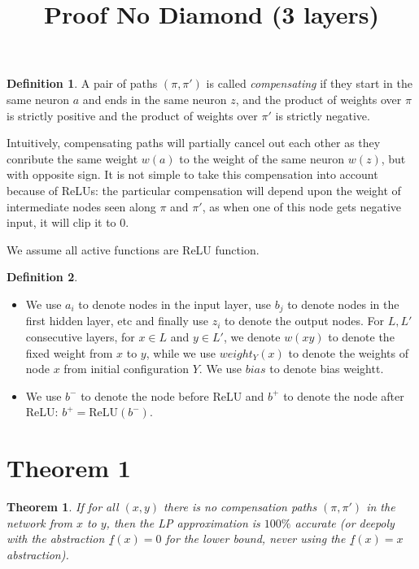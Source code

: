 \documentclass[]{article}
\title{Proof No Diamond (3 layers)}
\date{}
\newtheorem{theorem}{Theorem}
\theoremstyle{definition}
\newtheorem{definition}{Definition}
\newcommand{\ReLU}{\mathrm{ReLU}}
\begin{document}
\begin{definition}
	A pair of paths $(\pi,\pi')$
	is called {\em compensating} if they start in the same neuron $a$ and 
	ends in the same neuron $z$, and the product of weights over $\pi$ is strictly positive and the product of weights over $\pi'$ is strictly negative.
\end{definition}

Intuitively, compensating paths will partially cancel out each other as they conribute the same weight $w(a)$ to the weight of the same neuron $w(z)$, but with opposite sign. 
It is not simple to take this compensation into account because of ReLUs: the particular compensation will depend upon the weight of intermediate nodes seen along $\pi$ and $\pi'$, 
as when one of this node gets negative input, it will clip it to 0.


We assume all active functions are ReLU function.

\begin{definition}

	\begin{itemize}
	 \item  We use $a_i$ to denote nodes in the input layer, use $b_j$ to denote nodes in the first hidden layer, etc and finally use $z_i$ to denote the output nodes.
	For $L,L'$ consecutive layers, for $x \in L$ and $y \in L'$, we denote 
	$w({x y})$ to denote the fixed weight from $x$ to $y$, while we use
	$weight_Y(x)$ to denote the weights of node $x$ from initial configuration $Y$. 
	We use $bias$ to denote bias weightt.
	
	\item We use $b^-$ to denote the node before ReLU and $b^+$ to denote the node after ReLU: $b^+ = \ReLU(b^-)$.
	\end{itemize}
	
\end{definition}


\section{Theorem 1}



\begin{theorem}
	\label{th1}
	If for all $(x,y)$ there is no compensation paths $(\pi,\pi')$ 
	in the network from $x$ to $y$, then the LP approximation is 
	$100\%$ accurate (or deepoly with the abstraction $\underline{f}(x) = 0$ for the lower bound, never using the $\underline{f}(x) = x$ abstraction). 
\end{theorem}
\end{document}
